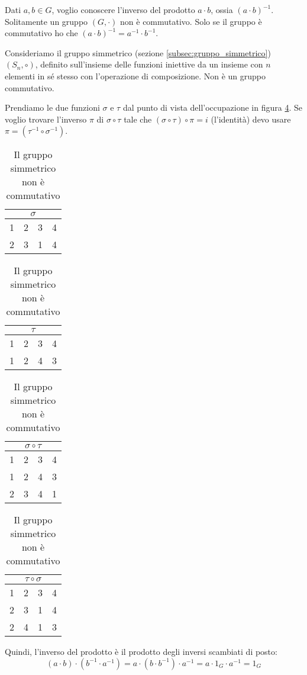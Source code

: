 Dati $a, b \in G$, voglio conoscere l'inverso del prodotto $a \cdot b$, ossia $(a \cdot b)^{-1}$. Solitamente un gruppo $(G, \cdot)$ non \`e commutativo. Solo se il gruppo \`e commutativo ho che $(a \cdot b)^{-1} = a^{-1} \cdot b^{-1}$.

Consideriamo il gruppo simmetrico (sezione \ref{subsec:gruppo_simmetrico}) $(S_n, \circ)$, definito sull'insieme delle funzioni iniettive da un insieme con $n$ elementi in s\'e stesso con l'operazione di composizione. Non \`e un gruppo commutativo.

Prendiamo le due funzioni $\sigma$ e $\tau$ dal punto di vista dell'occupazione in figura \ref{tab:gruppo_simmetrico}. Se voglio trovare l'inverso $\pi$ di $\sigma \circ \tau$ tale che $(\sigma \circ \tau) \circ \pi = i$ (l'identit\`a) devo usare $\pi = (\tau^{-1} \circ \sigma^{-1})$.

\begin{table}[ht]
\centering
\begin{tabular}{cccc}
\multicolumn{4}{c}{$\sigma$} \\
\hline
1 & 2 & 3 & 4 \\
2 & 3 & 1 & 4
\end{tabular}
\qquad
\begin{tabular}{cccc}
\multicolumn{4}{c}{$\tau$} \\
\hline
1 & 2 & 3 & 4 \\
1 & 2 & 4 & 3
\end{tabular}

\begin{tabular}{cccc}
\multicolumn{4}{c}{$\sigma \circ \tau$} \\
\hline
1 & 2 & 3 & 4 \\
1 & 2 & 4 & 3 \\
2 & 3 & 4 & 1
\end{tabular}
\qquad
\begin{tabular}{cccc}
\multicolumn{4}{c}{$\tau \circ \sigma$} \\
\hline
1 & 2 & 3 & 4 \\
2 & 3 & 1 & 4 \\
2 & 4 & 1 & 3
\end{tabular}
\caption{\label{tab:gruppo_simmetrico}Il gruppo simmetrico non \`e commutativo}
\end{table}

Quindi, l'inverso del prodotto \`e il prodotto degli inversi scambiati di posto:
\[
(a \cdot b) \cdot (b^{-1} \cdot a^{-1}) = a \cdot (b \cdot b^{-1}) 
\cdot a^{-1} = a \cdot 1_G \cdot a^{-1} = 1_G
\]

